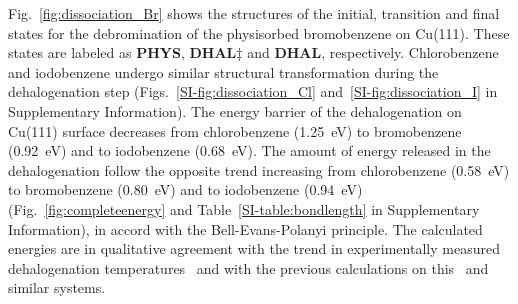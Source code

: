 \documentclass[%
 reprint,
 amsmath,amssymb,
 aps,
prb,
floatfix,
]{revtex4-2}
\newcommand{\lock}{\color{red}}
\newcommand{\lock}{\color{black}}
\newcommand{\comm}{\color{ForestGreen}} %
\newcommand{\sinfo}{Supplementary Information}
\begin{document}
{\lock

Fig.~\ref{fig:dissociation_Br} shows the structures of the initial, transition and final states for the debromination of the physisorbed bromobenzene on Cu(111). These states are labeled as \textbf{PHYS}, \textbf{DHAL$\ddagger$} and \textbf{DHAL}, respectively. Chlorobenzene and iodobenzene undergo similar structural transformation during the dehalogenation step (Figs.~\ref{SI-fig:dissociation_Cl} and~\ref{SI-fig:dissociation_I} in \sinfo).
%
%
The energy barrier of the dehalogenation on Cu(111) surface decreases from chlorobenzene (\SI{1.25}{\electronvolt}) to bromobenzene (\SI{0.92}{\electronvolt}) and to iodobenzene (\SI{0.68}{\electronvolt}). 
The amount of energy released in the dehalogenation follow the opposite trend increasing from chlorobenzene (\SI{0.58}{\electronvolt}) to bromobenzene (\SI{0.80}{\electronvolt}) and to iodobenzene (\SI{0.94}{\electronvolt}) (Fig.~\ref{fig:completeenergy} and Table~\ref{SI-table:bondlength} in \sinfo), in accord with the Bell-Evans-Polanyi principle.
%
The calculated energies are in qualitative agreement with the trend in experimentally measured dehalogenation temperatures~\cite{ullmann_52,ullmann_87,ullmann_67} and with the previous calculations on this~\cite{jacs2013} and similar systems.


}
\end{document}
